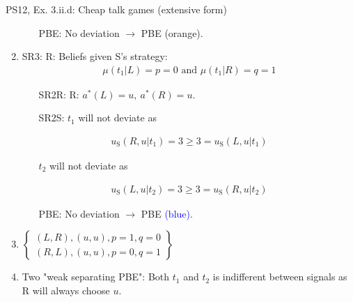 \begin{frame}{PS12, Ex. 3.ii.d: Cheap talk games (extensive form)}
\begin{multicols}{2}
\begin{enumerate}
        \begin{itemize}\normalsize
          \item[PBE:] No deviation $\rightarrow$ PBE \textcolor{YellowOrange}{(orange)}.
        \end{itemize}\vspace{-5pt}
        \item SR3: R: Beliefs given S's strategy:\vspace{-8pt}
        \begin{align*}
          \mu(t_1|L)=p=0\text{ and }\mu(t_1|R)=q=1
        \end{align*}\vspace{-18pt}
        \begin{itemize}\normalsize
          \item[SR2R:] R: $a^*(L)=u,\ a^*(R)=u$.
          \item[SR2S:] $t_1$ will not deviate as
        \end{itemize}\vspace{-10pt}
        \begin{align*}
          u_\text{S}(R,u|t_1)=3\geq 3=u_\text{S}(L,u|t_1)
        \end{align*}\vspace{-18pt}
        \begin{itemize}\normalsize
          \item[] $t_2$ will not deviate as
        \end{itemize}\vspace{-10pt}
        \begin{align*}
          u_\text{S}(L,u|t_2)=3\geq3=u_\text{S}(R,u|t_2)
        \end{align*}\vspace{-18pt}
        \begin{itemize}\normalsize
          \item[PBE:] No deviation $\rightarrow$ PBE \textcolor{blue}{(blue)}.
        \end{itemize}\vspace{-4pt}
        \item $\left\{\begin{array}{c}
            (L,R),(u,u),p=1,q=0\\
            (R,L),(u,u),p=0,q=1\end{array}\right\}$
        \item \vspace{-1pt}Two "weak separating PBE": Both $t_1$ and $t_2$ is indifferent between signals as R will always choose $u$.
      \end{enumerate}
      \vfill\null
    \end{multicols}
\end{frame}
